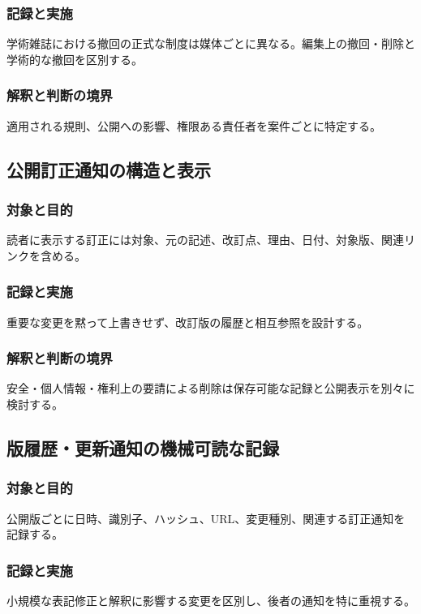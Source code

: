 \documentclass[a4paper,11pt]{article}
\begin{document}
\subsubsection{記録と実施}
\par 学術雑誌における撤回の正式な制度は媒体ごとに異なる。編集上の撤回・削除と学術的な撤回を区別する。\par\medskip
\subsubsection{解釈と判断の境界}
\par 適用される規則、公開への影響、権限ある責任者を案件ごとに特定する。\par\medskip
\subsection{公開訂正通知の構造と表示}
\subsubsection{対象と目的}
\par 読者に表示する訂正には対象、元の記述、改訂点、理由、日付、対象版、関連リンクを含める。\par\medskip
\subsubsection{記録と実施}
\par 重要な変更を黙って上書きせず、改訂版の履歴と相互参照を設計する。\par\medskip
\subsubsection{解釈と判断の境界}
\par 安全・個人情報・権利上の要請による削除は保存可能な記録と公開表示を別々に検討する。\par\medskip
\subsection{版履歴・更新通知の機械可読な記録}
\subsubsection{対象と目的}
\par 公開版ごとに日時、識別子、ハッシュ、URL、変更種別、関連する訂正通知を記録する。\par\medskip
\subsubsection{記録と実施}
\par 小規模な表記修正と解釈に影響する変更を区別し、後者の通知を特に重視する。\par\medskip
\end{document}
